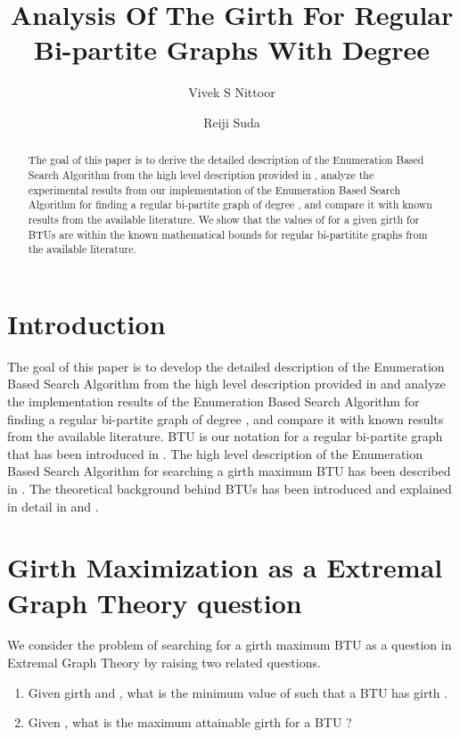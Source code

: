 \documentclass{llncs}
\begin{document}
\title{Analysis Of The Girth For Regular Bi-partite Graphs With Degree }

\author{Vivek S Nittoor \and Reiji Suda}


\maketitle
\begin{abstract}
The goal of this paper is to derive the detailed description of the Enumeration Based Search Algorithm from the high level description provided in , analyze the experimental results from our implementation of the Enumeration Based Search Algorithm for finding a regular bi-partite graph of degree , and compare it with known results from the available literature. We show that the values of  for a given girth  for  BTUs are within the known mathematical bounds for regular bi-partitite graphs from the available literature. 
\end{abstract}

\section{Introduction}
The goal of this paper is to develop the detailed description of the Enumeration Based Search Algorithm from the high level description provided in  and analyze the implementation results of the Enumeration Based Search Algorithm for finding a regular bi-partite graph of degree , and compare it with known results from the available literature.  BTU is our notation for a regular bi-partite graph that has been introduced in . The high level description of the Enumeration Based Search Algorithm for searching a girth maximum  BTU has been described in . The theoretical background behind BTUs has been introduced and  explained in detail in  and .

\section {Girth Maximization as a Extremal Graph Theory question}

We consider the problem of searching for a girth maximum  BTU as a question in Extremal Graph Theory by raising two related questions.
\begin{enumerate}
\item Given girth  and   , what is the minimum value of   such that a  BTU has girth   .
\item Given  , what is the maximum attainable girth for a  BTU ?
\end{enumerate}
\end{document}
